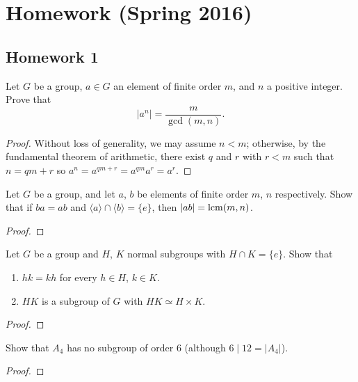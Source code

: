 \chapter{Homework (Spring 2016)}
\thispagestyle{empty}
\section{Homework 1}
\begin{problem}
Let $G$ be a group, $a\in G$ an element of finite order $m$, and $n$ a
positive integer. Prove that
\[
|a^n|=\frac{m}{\gcd(m,n)}.
\]
\end{problem}
\begin{proof}
Without loss of generality, we may assume $n<m$; otherwise, by the
fundamental theorem of arithmetic, there exist $q$ and $r$ with $r<m$ such
that $n=qm+r$ so $a^n=a^{qm+r}=a^{qm}a^r=a^r$.
\end{proof}

\begin{problem}
Let $G$ be a group, and let $a$, $b$ be elements of finite order $m$, $n$
respectively. Show that if $ba=ab$ and $\langle a\rangle\cap\langle
b\rangle=\{e\}$, then $|ab|=\operatorname{lcm}(m,n)$.
\end{problem}
\begin{proof}
\end{proof}

\begin{problem}
Let $G$ be a group and $H$, $K$ normal subgroups with $H\cap K=\{e\}$. Show
that
\begin{enumerate}[label=(\alph*)]
\item $hk=kh$ for every $h\in H$, $k\in K$.
\item $HK$ is a subgroup of $G$ with $HK\simeq H\times K$.
\end{enumerate}
\end{problem}
\begin{proof}
\end{proof}

\begin{problem}
Show that $A_4$ has no subgroup of order $6$ (although $6\mid 12=|A_4|$).
\end{problem}
\begin{proof}
\end{proof}

